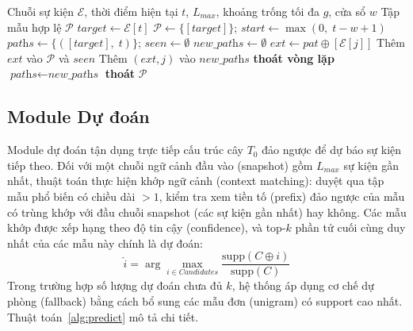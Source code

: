 \documentclass{article}
\begin{document}
\begin{algorithm}[!ht]
\caption{Sinh mẫu Gap-Aware Episode}
\label{alg:gap}
\small
\begin{algorithmic}[1]
\REQUIRE Chuỗi sự kiện $\mathcal{E}$, thời điểm hiện tại $t$, $L_{max}$, khoảng trống tối đa $g$, cửa sổ $w$
\ENSURE Tập mẫu hợp lệ $\mathcal{P}$
\STATE $\textit{target} \leftarrow \mathcal{E}[t]$
\STATE $\mathcal{P} \leftarrow \{[\textit{target}]\}$; $\textit{start} \leftarrow \max(0,\; t - w + 1)$
\STATE $\textit{paths} \leftarrow \{([\textit{target}],\; t)\}$; $\textit{seen} \leftarrow \emptyset$
    \STATE $\textit{new\_paths} \leftarrow \emptyset$
            \STATE $\textit{ext} \leftarrow \textit{pat} \oplus [\mathcal{E}[j]]$ 
                \STATE Thêm $\textit{ext}$ vào $\mathcal{P}$ và $\textit{seen}$
                \STATE Thêm $(\textit{ext}, j)$ vào $\textit{new\_paths}$
            \ENDIF
                \STATE \textbf{thoát vòng lặp} 
            \ENDIF
        \ENDFOR
    \ENDFOR
    \STATE $\textit{paths} \leftarrow \textit{new\_paths}$
        \STATE \textbf{thoát}
    \ENDIF
\ENDFOR
\RETURN $\mathcal{P}$
\end{algorithmic}
\end{algorithm}

\vspace{-0.5em}
\subsection{Module Dự đoán}
Module dự đoán tận dụng trực tiếp cấu trúc cây $T_0$ đảo ngược để dự báo sự kiện tiếp theo. Đối với một chuỗi ngữ cảnh đầu vào (snapshot) gồm $L_{max}$ sự kiện gần nhất, thuật toán thực hiện khớp ngữ cảnh (context matching): duyệt qua tập mẫu phổ biến có chiều dài $> 1$, kiểm tra xem tiền tố (prefix) đảo ngược của mẫu có trùng khớp với đầu chuỗi snapshot (các sự kiện gần nhất) hay không. Các mẫu khớp được xếp hạng theo độ tin cậy (confidence), và top-$k$ phần tử cuối cùng duy nhất của các mẫu này chính là dự đoán:
\begin{equation}
    \hat{i} = \arg\max_{i \in \textit{Candidates}} \frac{\text{supp}(C \oplus i)}{\text{supp}(C)}
\end{equation}
Trong trường hợp số lượng dự đoán chưa đủ $k$, hệ thống áp dụng cơ chế dự phòng (fallback) bằng cách bổ sung các mẫu đơn (unigram) có support cao nhất. Thuật toán~\ref{alg:predict} mô tả chi tiết.
\end{document}
